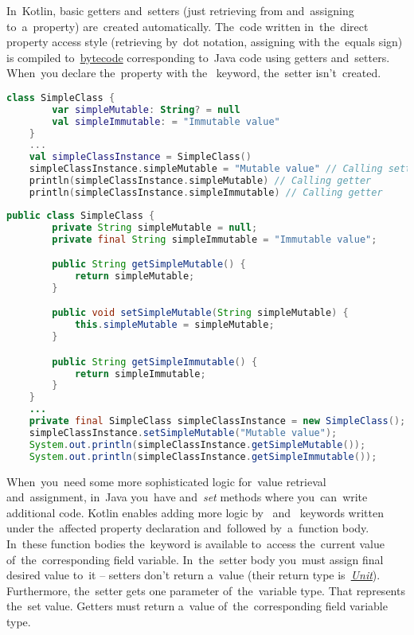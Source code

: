 \label{kotlingetset}
In~Kotlin, basic getters and~setters (just retrieving from and~assigning to~a~property) are~created automatically.
The~code written in~the~direct property access style (retrieving by~dot notation, assigning with the~equals sign) is compiled to~\hyperref[javabytecode]{bytecode} corresponding to~Java code using getters and~setters.
When~you declare the~property with the~ keyword, the~setter isn't~created.
\newline

\example
\begin{lstlisting}[language=Kotlin, title={Direct property access in Kotlin}]
    class SimpleClass {
        var simpleMutable: String? = null
        val simpleImmutable: = "Immutable value"
    }
    ...
    val simpleClassInstance = SimpleClass()
    simpleClassInstance.simpleMutable = "Mutable value" // Calling setter
    println(simpleClassInstance.simpleMutable) // Calling getter
    println(simpleClassInstance.simpleImmutable) // Calling getter
\end{lstlisting}
\newpage

\begin{lstlisting}[language=Java, title={Java equivalent}]
    public class SimpleClass {
        private String simpleMutable = null;
        private final String simpleImmutable = "Immutable value";

        public String getSimpleMutable() {
            return simpleMutable;
        }

        public void setSimpleMutable(String simpleMutable) {
            this.simpleMutable = simpleMutable;
        }

        public String getSimpleImmutable() {
            return simpleImmutable;
        }
    }
    ...
    private final SimpleClass simpleClassInstance = new SimpleClass();
    simpleClassInstance.setSimpleMutable("Mutable value");
    System.out.println(simpleClassInstance.getSimpleMutable());
    System.out.println(simpleClassInstance.getSimpleImmutable());
\end{lstlisting}
\newline

\noindent When~you~need some more sophisticated logic for~value retrieval and~assignment, in~Java you~have  \mbox{and \textit{set}} methods where you~can~write additional code.
Kotlin enables adding more logic \mbox{by } \mbox{and } keywords written under the~affected property declaration and~followed by~a~function body.
In~these function bodies the~keyword  is available to~access the~current value of~the~corresponding field variable.
In~the~setter body you~must assign final desired value to~it -- setters don't return a~value (their return type \mbox{is \hyperref[kotlinunit]{\textit{Unit}}}).
Furthermore, the~setter gets one parameter of~the~variable type.
That represents the~set value.
Getters must return a~value of~the~corresponding field variable type.

